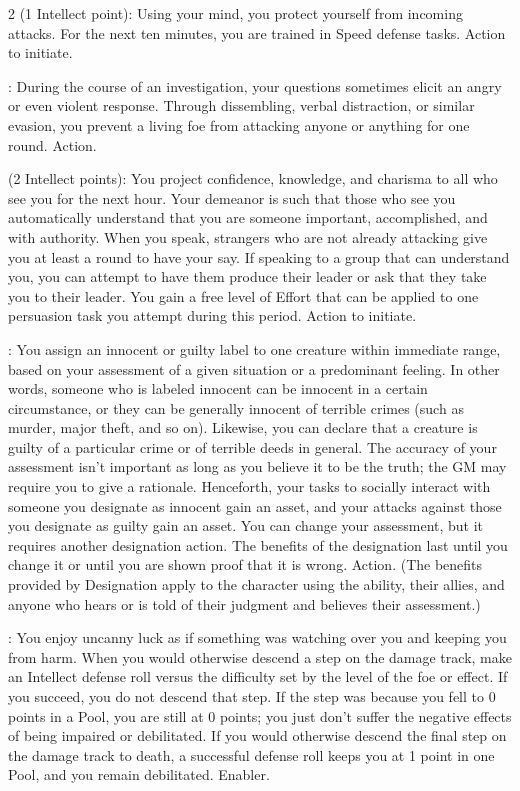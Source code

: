 \begin{multicols}{2}
 (1 Intellect point): Using your mind, you protect yourself from incoming attacks. For the next ten minutes, you are trained in Speed defense tasks. Action to initiate. 

: During the course of an investigation, your questions sometimes elicit an angry or even violent response. Through dissembling, verbal distraction, or similar evasion, you prevent a living foe from attacking anyone or anything for one round. Action. 

 (2 Intellect points): You project confidence, knowledge, and charisma to all who see you for the next hour. Your demeanor is such that those who see you automatically understand that you are someone important, accomplished, and with authority. When you speak, strangers who are not already attacking give you at least a round to have your say. If speaking to a group that can understand you, you can attempt to have them produce their leader or ask that they take you to their leader. You gain a free level of Effort that can be applied to one persuasion task you attempt during this period. Action to initiate.

: You assign an innocent or guilty label to one creature within immediate range, based on your assessment of a given situation or a predominant feeling. In other words, someone who is labeled innocent can be innocent in a certain circumstance, or they can be generally innocent of terrible crimes (such as murder, major theft, and so on). Likewise, you can declare that a creature is guilty of a particular crime or of terrible deeds in general. The accuracy of your assessment isn’t important as long as you believe it to be the truth; the GM may require you to give a rationale. Henceforth, your tasks to socially interact with someone you designate as innocent gain an asset, and your attacks against those you designate as guilty gain an asset. You can change your assessment, but it requires another designation action. The benefits of the designation last until you change it or until you are shown proof that it is wrong. Action. (The benefits provided by Designation apply to the character using the ability, their allies, and anyone who hears or is told of their judgment and believes their assessment.)

: You enjoy uncanny luck as if something was watching over you and keeping you from harm. When you would otherwise descend a step on the damage track, make an Intellect defense roll versus the difficulty set by the level of the foe or effect. If you succeed, you do not descend that step. If the step was because you fell to 0 points in a Pool, you are still at 0 points; you just don’t suffer the negative effects of being impaired or debilitated. If you would otherwise descend the final step on the damage track to death, a successful defense roll keeps you at 1 point in one Pool, and you remain debilitated. Enabler.


\end{multicols}
